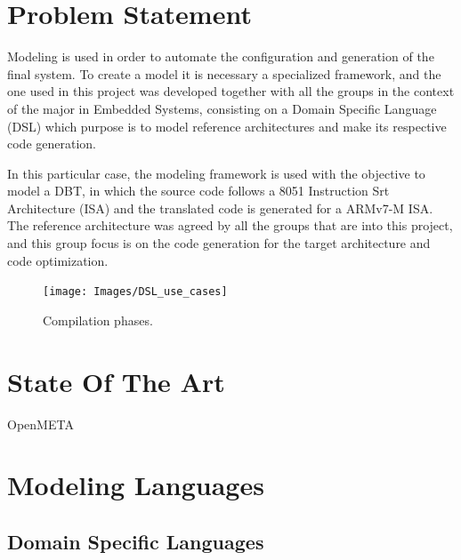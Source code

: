 \documentclass{report}
\begin{document}
	\section{Problem Statement}
	
	\par Modeling is used in order to automate the configuration and generation of the final system. To create a model it is necessary a specialized framework, and the one used in this project was developed together with all the groups in the context of the major in Embedded Systems, consisting on a Domain Specific Language (DSL) which purpose is to model reference architectures and make its respective code generation. 
	\par In this particular case, the modeling framework is used with the objective to model a DBT, in which the source code follows a 8051 Instruction Srt Architecture (ISA) and the translated code is generated for a ARMv7-M ISA.  The reference architecture was agreed by all the groups that are into this project, and this group focus is on the code generation for the target architecture and code optimization.
	
	\begin{figure} [h]
		\centering
		\texttt{[image: Images/DSL\_use\_cases]}
		\caption{Compilation phases.}
		\label{fig:compiler-sequence}
	\end{figure}
	

	\par 
	\section{State Of The Art}

	\par OpenMETA

	\section{Modeling Languages}

		\subsection{Domain Specific Languages}
		
\end{document}
